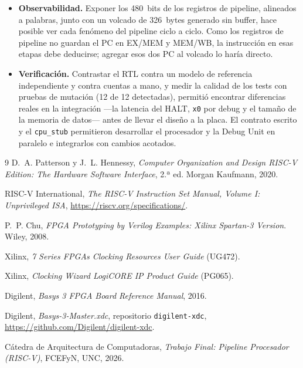\documentclass[12pt,a4paper]{article}
\begin{document}
\begin{itemize}
  \item \textbf{Observabilidad.} Exponer los 480~bits de los registros de
  pipeline, alineados a palabras, junto con un volcado de 326~bytes generado sin
  buffer, hace posible ver cada fenómeno del pipeline ciclo a ciclo. Como los
  registros de pipeline no guardan el PC en EX/MEM y MEM/WB, la instrucción en
  esas etapas debe deducirse; agregar esos dos PC al volcado lo haría directo.

  \item \textbf{Verificación.} Contrastar el RTL contra un modelo de referencia
  independiente y contra cuentas a mano, y medir la calidad de los tests con
  pruebas de mutación (12 de 12 detectadas), permitió encontrar diferencias
  reales en la integración ---la latencia del HALT, \texttt{x0} por debug y el
  tamaño de la memoria de datos--- antes de llevar el diseño a la placa. El
  contrato escrito y el \texttt{cpu\_stub} permitieron desarrollar el
  procesador y la Debug Unit en paralelo e integrarlos con cambios acotados.
\end{itemize}

\begin{thebibliography}{9}
D.~A. Patterson y J.~L. Hennessy, \emph{Computer Organization and Design RISC-V
Edition: The Hardware Software Interface}, 2.ª ed. Morgan Kaufmann, 2020.

RISC-V International, \emph{The RISC-V Instruction Set Manual, Volume I:
Unprivileged ISA}, \url{https://riscv.org/specifications/}.

P.~P. Chu, \emph{FPGA Prototyping by Verilog Examples: Xilinx Spartan-3 Version}.
Wiley, 2008.

Xilinx, \emph{7 Series FPGAs Clocking Resources User Guide} (UG472).

Xilinx, \emph{Clocking Wizard LogiCORE IP Product Guide} (PG065).

Digilent, \emph{Basys 3 FPGA Board Reference Manual}, 2016.

Digilent, \emph{Basys-3-Master.xdc}, repositorio \texttt{digilent-xdc},
\url{https://github.com/Digilent/digilent-xdc}.

Cátedra de Arquitectura de Computadoras, \emph{Trabajo Final: Pipeline
Procesador (RISC-V)}, FCEFyN, UNC, 2026.
\end{thebibliography}
\end{document}
